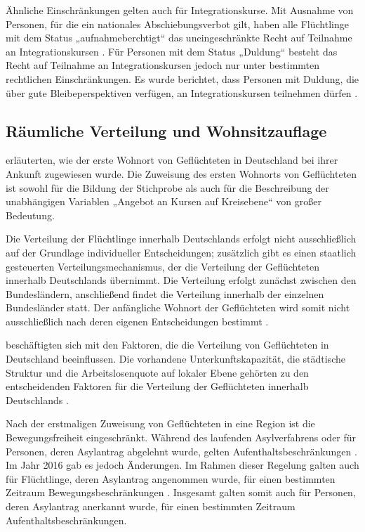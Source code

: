 Ähnliche Einschränkungen gelten auch für Integrationskurse. Mit Ausnahme von Personen, für die ein nationales Abschiebungsverbot gilt, haben alle Flüchtlinge mit dem Status „aufnahmeberchtigt“ das uneingeschränkte Recht auf Teilnahme an Integrationskursen \parencite{stache2024auswirkungen} . Für Personen mit dem Status „Duldung“ besteht das Recht auf Teilnahme an Integrationskursen jedoch nur unter bestimmten rechtlichen Einschränkungen. Es wurde berichtet, dass Personen mit Duldung, die über gute Bleibeperspektiven verfügen, an Integrationskursen teilnehmen dürfen \parencite{kosyakova2020role}.

\subsection{Räumliche Verteilung und Wohnsitzauflage}
\label{sec:raum-vert-wohn}

\textcite{Kanas:2023} erläuterten, wie der erste Wohnort von Geflüchteten in Deutschland bei ihrer Ankunft zugewiesen wurde. Die Zuweisung des ersten Wohnorts von Geflüchteten ist sowohl für die Bildung der Stichprobe als auch für die Beschreibung der unabhängigen Variablen „Angebot an Kursen auf Kreisebene“ von großer Bedeutung.

Die Verteilung der Flüchtlinge innerhalb Deutschlands erfolgt nicht ausschließlich auf der Grundlage individueller Entscheidungen; zusätzlich gibt es einen staatlich gesteuerten Verteilungsmechanismus, der die Verteilung der Geflüchteten innerhalb Deutschlands übernimmt. Die Verteilung erfolgt zunächst zwischen den Bundesländern, anschließend findet die Verteilung innerhalb der einzelnen Bundesländer statt. Der anfängliche Wohnort der Geflüchteten wird somit nicht ausschließlich nach deren eigenen Entscheidungen bestimmt \parencite{geis2016fluchtlinge}.

\textcite{Kanas:2023} beschäftigten sich mit den Faktoren, die die Verteilung von Geflüchteten in Deutschland beeinflussen. Die vorhandene Unterkunftskapazität, die städtische Struktur und die Arbeitslosenquote auf lokaler Ebene gehörten zu den entscheidenden Faktoren für die Verteilung der Geflüchteten innerhalb Deutschlands \parencites {entorf2019refugees}{geis2016fluchtlinge}.


Nach der erstmaligen Zuweisung von Geflüchteten in eine Region ist die Bewegungsfreiheit eingeschränkt. Während des laufenden Asylverfahrens oder für Personen, deren Asylantrag abgelehnt wurde, gelten Aufenthaltsbeschränkungen \parencite{haberstroh2020migration}. Im Jahr 2016 gab es jedoch Änderungen. Im Rahmen dieser Regelung galten auch für Flüchtlinge, deren Asylantrag angenommen wurde, für einen bestimmten Zeitraum Bewegungsbeschränkungen \parencite[108]{haberstroh2020migration}. Insgesamt galten somit auch für Personen, deren Asylantrag anerkannt wurde, für einen bestimmten Zeitraum Aufenthaltsbeschränkungen. 


